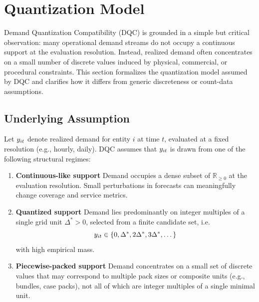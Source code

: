 
\section{Quantization Model}
\label{sec:dqc_quantization_model}

Demand Quantization Compatibility (DQC) is grounded in a simple but critical
observation: many operational demand streams do not occupy a continuous support
at the evaluation resolution. Instead, realized demand often concentrates on a
small number of discrete values induced by physical, commercial, or procedural
constraints. This section formalizes the quantization model assumed by DQC and
clarifies how it differs from generic discreteness or count-data assumptions.

\subsection{Underlying Assumption}

Let $y_{it}$ denote realized demand for entity $i$ at time $t$, evaluated at a
fixed resolution (e.g., hourly, daily). DQC assumes that $y_{it}$ is drawn from
one of the following structural regimes:

\begin{enumerate}
  \item \textbf{Continuous-like support}
  Demand occupies a dense subset of $\mathbb{R}_{\ge 0}$ at the evaluation
  resolution. Small perturbations in forecasts can meaningfully change coverage
  and service metrics.

  \item \textbf{Quantized support}
  Demand lies predominantly on integer multiples of a single grid unit
  $\Delta^{\ast} > 0$, selected from a finite candidate set, i.e.
  \[
    y_{it} \in \{0, \Delta^{\ast}, 2\Delta^{\ast}, 3\Delta^{\ast}, \dots\}
  \]
  with high empirical mass.

  \item \textbf{Piecewise-packed support}
  Demand concentrates on a small set of discrete values that may correspond to
  multiple pack sizes or composite units (e.g., bundles, case packs), not all of
  which are integer multiples of a single minimal unit.
\end{enumerate}

